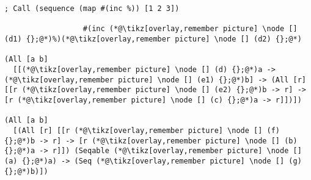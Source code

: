\documentclass[9pt]{extarticle}
\begin{document}
\begin{lstlisting}
; Call (sequence (map #(inc %)) [1 2 3])

                  #(inc (*@\tikz[overlay,remember picture] \node [] (d1) {};@*)%)(*@\tikz[overlay,remember picture] \node [] (d2) {};@*)

(All [a b]
  [[(*@\tikz[overlay,remember picture] \node [] (d) {};@*)a -> (*@\tikz[overlay,remember picture] \node [] (e1) {};@*)b] -> (All [r] [[r (*@\tikz[overlay,remember picture] \node [] (e2) {};@*)b -> r] -> [r (*@\tikz[overlay,remember picture] \node [] (c) {};@*)a -> r]])])

(All [a b]
  [(All [r] [[r (*@\tikz[overlay,remember picture] \node [] (f) {};@*)b -> r] -> [r (*@\tikz[overlay,remember picture] \node [] (b) {};@*)a -> r]]) (Seqable (*@\tikz[overlay,remember picture] \node [] (a) {};@*)a) -> (Seq (*@\tikz[overlay,remember picture] \node [] (g) {};@*)b)])
\end{lstlisting}
\end{document}
